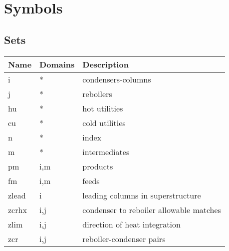 \documentclass[11pt]{article}
\begin{document}
\section*{Symbols}


\subsection*{Sets}
\begin{tabularx}{\textwidth}{| l | l | X |}
\hline
\textbf{Name} & \textbf{Domains} & \textbf{Description}\\
\hline
\endhead

i & * & condensers-columns\\
j & * & reboilers\\
hu & * & hot utilities\\
cu & * & cold utilities\\
n & * & index\\
m & * & intermediates\\
pm & i,m & products\\
fm & i,m & feeds\\
zlead & i & leading columns in superstructure\\
zcrhx & i,j & condenser to reboiler allowable matches\\
zlim & i,j & direction of heat integration\\
zcr & i,j & reboiler-condenser pairs\\
\hline
\end{tabularx}
\end{document}
